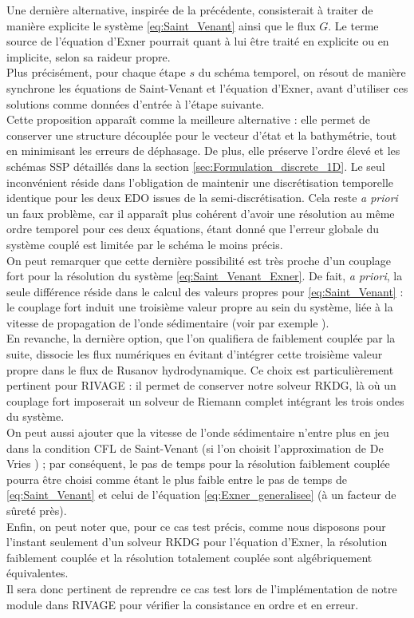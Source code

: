 \documentclass[11pt, a4paper, oneside]{report}
\begin{document}
Une dernière alternative, inspirée de la précédente, consisterait à traiter de manière explicite le système \eqref{eq:Saint_Venant} ainsi que le flux $G$. Le terme source de l'équation d'Exner pourrait quant à lui être traité en explicite ou en implicite, selon sa raideur propre. \\
Plus précisément, pour chaque étape $s$ du schéma temporel, on résout de manière synchrone les équations de Saint-Venant et l'équation d'Exner, avant d'utiliser ces solutions comme données d'entrée à l'étape suivante. \\
Cette proposition apparaît comme la meilleure alternative : elle permet de conserver une structure découplée pour le vecteur d'état et la bathymétrie, tout en minimisant les erreurs de déphasage. De plus, elle préserve l'ordre élevé et les schémas SSP détaillés dans la section \ref{sec:Formulation_discrete_1D}. Le seul inconvénient réside dans l'obligation de maintenir une discrétisation temporelle identique pour les deux EDO issues de la semi-discrétisation. Cela reste \textit{a priori} un faux problème, car il apparaît plus cohérent d'avoir une résolution au même ordre temporel pour ces deux équations, étant donné que l'erreur globale du système couplé est limitée par le schéma le moins précis. \\

On peut remarquer que cette dernière possibilité est très proche d'un couplage fort pour la résolution du système \eqref{eq:Saint_Venant_Exner}. De fait, \textit{a priori}, la seule différence réside dans le calcul des valeurs propres pour \eqref{eq:Saint_Venant} : le couplage fort induit une troisième valeur propre au sein du système, liée à la vitesse de propagation de l'onde sédimentaire (voir par exemple \cite{fernandez2025third}). \\
En revanche, la dernière option, que l'on qualifiera de faiblement couplée par la suite, dissocie les flux numériques en évitant d'intégrer cette troisième valeur propre dans le flux de Rusanov hydrodynamique. Ce choix est particulièrement pertinent pour RIVAGE : il permet de conserver notre solveur RKDG, là où un couplage fort imposerait un solveur de Riemann complet intégrant les trois ondes du système. \\
On peut aussi ajouter que la vitesse de l'onde sédimentaire n'entre plus en jeu dans la condition CFL de Saint-Venant (si l'on choisit l'approximation de De Vries \cite{vries1965considerations}) ; par conséquent, le pas de temps pour la résolution faiblement couplée pourra être choisi comme étant le plus faible entre le pas de temps de \eqref{eq:Saint_Venant} et celui de l'équation \eqref{eq:Exner_generalisee} (à un facteur de sûreté près). \\
Enfin, on peut noter que, pour ce cas test précis, comme nous disposons pour l'instant seulement d'un solveur RKDG pour l'équation d'Exner, la résolution faiblement couplée et la résolution totalement couplée sont algébriquement équivalentes. \\
Il sera donc pertinent de reprendre ce cas test lors de l'implémentation de notre module dans RIVAGE pour vérifier la consistance en ordre et en erreur.
\end{document}
